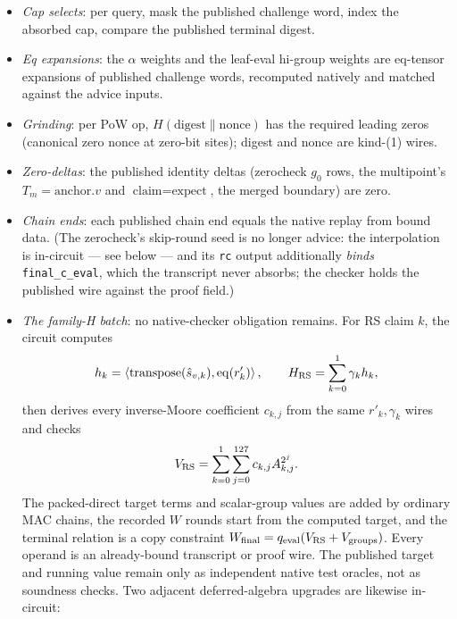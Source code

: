 \documentclass[11pt]{article}
\newcommand{\code}[1]{\texttt{#1}}
\theoremstyle{definition}
\begin{document}
\begin{itemize}[nosep]
  \item \emph{Cap selects}: per query, mask the published challenge word,
        index the absorbed cap, compare the published terminal digest.
  \item \emph{Eq expansions}: the $\alpha$ weights and the leaf-eval
        hi-group weights are $\mathrm{eq}$-tensor expansions of published
        challenge words, recomputed natively and matched against the
        advice inputs.
  \item \emph{Grinding}: per PoW op, $H(\text{digest} \| \text{nonce})$
        has the required leading zeros (canonical zero nonce at zero-bit
        sites); digest and nonce are kind-(1) wires.
  \item \emph{Zero-deltas}: the published identity deltas (zerocheck
        $g_0$ rows, the multipoint's $T_m = \text{anchor}.v$ and
        $\text{claim} = \text{expect}$, the merged boundary) are zero.
  \item \emph{Chain ends}: each published chain end equals the native
        replay from bound data. (The zerocheck's skip-round seed is no
        longer advice: the interpolation is in-circuit — see below — and
        its \code{rc} output additionally \emph{binds}
        \code{final\_c\_eval}, which the transcript never absorbs; the
        checker holds the published wire against the proof field.)
  \item \emph{The family-H batch}: no native-checker obligation remains.
        For RS claim $k$, the circuit computes
        \[
          h_k=\left\langle
             \operatorname{transpose}(\hat s_{v,k}),
             \operatorname{eq}(r'_k)
          \right\rangle,
          \qquad H_{\rm RS}=\sum_{k=0}^{1}\gamma_k h_k,
        \]
        then derives every inverse-Moore coefficient $c_{k,j}$ from the
        same $r'_k,\gamma_k$ wires and checks
        \[
          V_{\rm RS}=\sum_{k=0}^{1}\sum_{j=0}^{127}
             c_{k,j} A_{k,j}^{2^j}.
        \]
        The packed-direct target terms and scalar-group values are added by
        ordinary MAC chains, the recorded $W$ rounds start from the computed
        target, and the terminal relation is a copy constraint
        $W_{\rm final}=q_{\rm eval}(V_{\rm RS}+V_{\rm groups})$.
        Every operand is an already-bound transcript or proof wire. The
        published target and running value remain only as independent native
        test oracles, not as soundness checks. Two adjacent deferred-algebra
        upgrades are likewise in-circuit:

\end{itemize}
\end{document}
